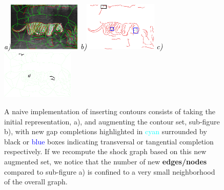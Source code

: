 \begin{figure}[!ht]
\centering
{\footnotesize\textit{\textcolor{black}{a)}}}\includegraphics[width=0.31\textwidth]{figs/tiger_lg_fig1.pdf}
{\footnotesize\textit{\textcolor{black}{b)}}}\includegraphics[width=0.31\textwidth]{figs/tiger_lg_fig2.pdf}
{\footnotesize\textit{\textcolor{black}{c)}}}\includegraphics[width=0.31\textwidth]{figs/tiger_lg_fig3.pdf}
\caption{A naive implementation of inserting contours consists of taking the initial representation, a), and augmenting the contour set, sub-figure b), with new gap completions highlighted in \textcolor{cyan}{cyan} surrounded by black or \textcolor{blue}{blue} boxes indicating transversal or tangential completion respectively. If we recompute the shock graph based on this new augmented set, we notice that the number of new {\bf edges/nodes} compared to sub-figure a) is confined to a very small neighborhood of the overall graph. } 
\label{fig:global_to_local}
\end{figure}

